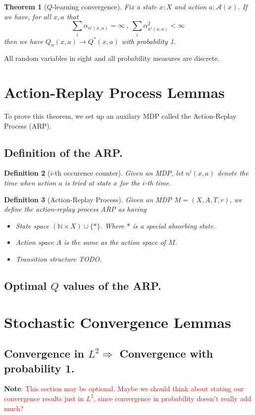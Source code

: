 \documentclass{article}
\def\act{\mathcal{A}}
\newcommand{\red}[1]{\textcolor{red}{#1}}
\newtheorem{theorem}{Theorem}
\newtheorem{defn}[theorem]{Definition}
\begin{document}
\begin{theorem} [$Q$-learning convergence]
Fix a state $x:X$ and action $a : \act(x)$. 
If we have, for all $x,a$ that
\[
\sum_{i}\alpha_{n^i(x,a)} = \infty \ , \ \sum_{i}\alpha_{n^i(x,a)}^2 < \infty \ 
\]
then we have $Q_n(x,a) \rightarrow Q^*(x,a)$ with probability 1. 
\end{theorem}

All random variables in sight and all probability measures are discrete. 

\section{Action-Replay Process Lemmas}
To prove this theorem, we set up an auxilary MDP called the Action-Replay Process (ARP). 
\subsection{Definition of the ARP.}
\begin{defn}[$i$-th occurence counter]
Given an MDP, let $n^i(x,a)$ denote the time when action $a$ is tried at state $x$ for the $i$-th time. 
\end{defn}

\begin{defn}[Action-Replay Process]
Given an MDP $M = (X,A,T,r)$, we define the action-replay process ARP as having 
\begin{itemize}
    \item State space $(\mathbb{N}\times X) \cup \{\ast\}$. Where $\ast$ is a special absorbing state.
    \item Action space $A$ is the same as the action space of $M$.
    \item Transition structure TODO. 
\end{itemize}
\end{defn}

\subsection{Optimal $Q$ values of the ARP.}

\section{Stochastic Convergence Lemmas}
\subsection{Convergence in $L^2 \Rightarrow$ Convergence with probability 1.}
\textbf{Note}: \red{This section may be optional. Maybe we should think about stating our convergence results just in $L^2$, since convergence in probability doesn't really add much?}
\end{document}
